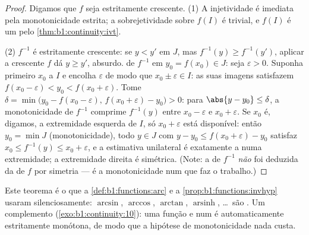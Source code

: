 \begin{proof}
Digamos que $f$ seja estritamente crescente. (1) A injetividade é
imediata pela monotonicidade estrita; a sobrejetividade sobre $f(I)$ é
trivial, e $f(I)$ é um  pelo \cref{thm:b1:continuity:ivt}.

(2) $f^{-1}$ é estritamente crescente: se $y < y'$ em $J$, mas $f^{-1}(y)
\geq f^{-1}(y')$, aplicar a crescente $f$ dá $y \geq y'$,
absurdo.  de $f^{-1}$ em $y_0 = f(x_0) \in J$: seja
$\varepsilon > 0$. Suponha primeiro $x_0$  a $I$ e
encolha $\varepsilon$ de modo que $x_0 \pm \varepsilon \in I$: as suas
imagens satisfazem $f(x_0 - \varepsilon) < y_0 < f(x_0 +
\varepsilon)$. Tome
$\delta = \min\bigl(y_0 - f(x_0 - \varepsilon),\, f(x_0 +
\varepsilon) - y_0\bigr) > 0$: para $\abs{y - y_0} \leq \delta$,
a monotonicidade de $f^{-1}$ comprime $f^{-1}(y)$ entre $x_0 -
\varepsilon$ e $x_0 + \varepsilon$. Se $x_0$ é, digamos, a
extremidade esquerda de $I$, só $x_0 + \varepsilon$ está disponível: então
$y_0 = \min J$ (monotonicidade), todo $y \in J$ com $y - y_0
\leq f(x_0 + \varepsilon) - y_0$ satisfaz $x_0 \leq f^{-1}(y)
\leq x_0 + \varepsilon$, e a estimativa unilateral é exatamente a
 numa extremidade; a extremidade direita é simétrica.
(Note: a  de $f^{-1}$
\emph{não} foi deduzida da de $f$ por simetria --- é a
monotonicidade num  que faz o trabalho.)
\end{proof}

\begin{remark}
Este teorema é o que a \cref{def:b1:functions:arc} e a
\cref{prop:b1:functions:invhyp} usaram silenciosamente: $\arcsin$, $\arccos$,
$\arctan$, $\operatorname{arsinh}$, \dots\ são . Um
complemento (\cref{exo:b1:continuity:10}): uma função  e
\emph{} num  é automaticamente estritamente
monótona, de modo que a hipótese de monotonicidade nada custa.
\end{remark}

